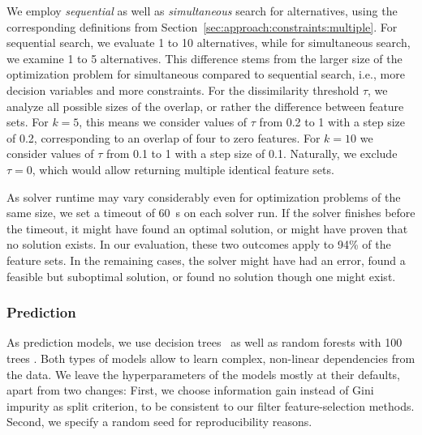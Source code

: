 \documentclass{article}
\theoremstyle{definition}
\begin{document}
We employ \emph{sequential} as well as \emph{simultaneous} search for alternatives, using the corresponding definitions from Section~\ref{sec:approach:constraints:multiple}.
For sequential search, we evaluate 1 to 10 alternatives, while for simultaneous search, we examine 1 to 5 alternatives.
This difference stems from the larger size of the optimization problem for simultaneous compared to sequential search, i.e., more decision variables and more constraints.
For the dissimilarity threshold $\tau$, we analyze all possible sizes of the overlap, or rather the difference between feature sets.
For $k=5$, this means we consider values of $\tau$ from 0.2 to 1 with a step size of 0.2, corresponding to an overlap of four to zero features.
For $k=10$ we consider values of $\tau$ from 0.1 to 1 with a step size of 0.1.
Naturally, we exclude $\tau = 0$, which would allow returning multiple identical feature sets.

As solver runtime may vary considerably even for optimization problems of the same size, we set a timeout of 60~s on each solver run.
If the solver finishes before the timeout, it might have found an optimal solution, or might have proven that no solution exists.
In our evaluation, these two outcomes apply to 94\% of the feature sets.
In the remaining cases, the solver might have had an error, found a feasible but suboptimal solution, or found no solution though one might exist.


\subsubsection{Prediction}
\label{sec:experimental-design:approaches:prediction}

As prediction models, we use decision trees~\cite{breiman1984classification} as well as random forests with 100 trees \cite{breiman2001random}.
Both types of models allow to learn complex, non-linear dependencies from the data.
We leave the hyperparameters of the models mostly at their defaults, apart from two changes:
First, we choose information gain instead of Gini impurity as split criterion, to be consistent to our filter feature-selection methods.
Second, we specify a random seed for reproducibility reasons.
\end{document}
